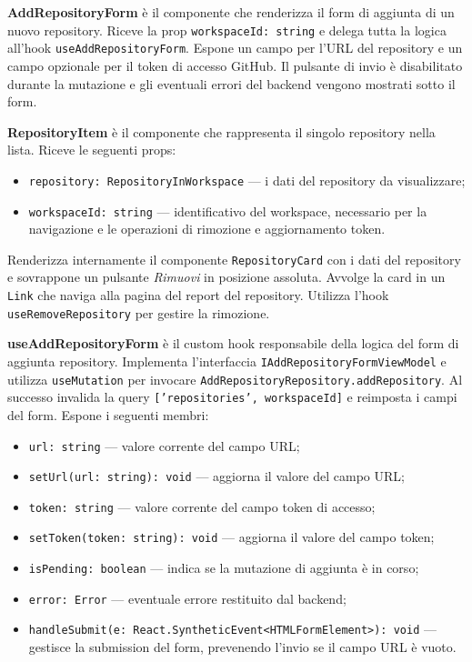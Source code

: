 \documentclass[a4paper, 11pt]{article}
\newcounter{subsubsubsection}[subsubsection]
\newcounter{subsubsubsubsection}[subsubsubsection]
\begin{document}
\textbf{AddRepositoryForm} è il componente che renderizza il form di aggiunta di un nuovo
repository. Riceve la prop \texttt{workspaceId: string} e delega tutta la logica all'hook
\texttt{useAddRepositoryForm}. Espone un campo per l'URL del repository e un campo opzionale
per il token di accesso GitHub. Il pulsante di invio è disabilitato durante la mutazione e
gli eventuali errori del backend vengono mostrati sotto il form.

\textbf{RepositoryItem} è il componente che rappresenta il singolo repository nella lista.
Riceve le seguenti props:
\begin{itemize}
  \item \texttt{repository: RepositoryInWorkspace} — i dati del repository da visualizzare;
  \item \texttt{workspaceId: string} — identificativo del workspace, necessario per la
        navigazione e le operazioni di rimozione e aggiornamento token.
\end{itemize}
Renderizza internamente il componente \texttt{RepositoryCard} con i dati del repository e
sovrappone un pulsante \textit{Rimuovi} in posizione assoluta. Avvolge la card in un
\texttt{Link} che naviga alla pagina del report del repository. Utilizza l'hook
\texttt{useRemoveRepository} per gestire la rimozione.


\textbf{useAddRepositoryForm} è il custom hook responsabile della logica del form di aggiunta
repository. Implementa l'interfaccia \texttt{IAddRepositoryFormViewModel} e utilizza
\texttt{useMutation} per invocare \texttt{AddRepositoryRepository.addRepository}. Al successo
invalida la query \texttt{['repositories', workspaceId]} e reimposta i campi del form. Espone
i seguenti membri:
\begin{itemize}
  \item \texttt{url: string} — valore corrente del campo URL;
  \item \texttt{setUrl(url: string): void} — aggiorna il valore del campo URL;
  \item \texttt{token: string} — valore corrente del campo token di accesso;
  \item \texttt{setToken(token: string): void} — aggiorna il valore del campo token;
  \item \texttt{isPending: boolean} — indica se la mutazione di aggiunta è in corso;
  \item \texttt{error: Error} — eventuale errore restituito dal backend;
  \item \texttt{handleSubmit(e: React.SyntheticEvent<HTMLFormElement>): void} — gestisce la
        submission del form, prevenendo l'invio se il campo URL è vuoto.
\end{itemize}
\end{document}
